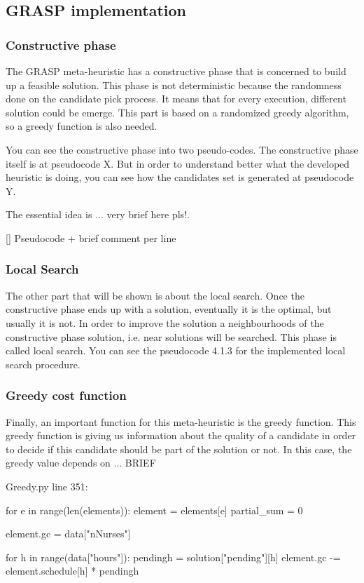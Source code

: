 \subsection{GRASP implementation}

\subsubsection{Constructive phase}

The GRASP meta-heuristic has a constructive phase that is concerned to build up a feasible solution. This phase is not deterministic because the randomness done on the candidate pick process. It means
that for every execution, different solution could be emerge. This part is based on a randomized greedy algorithm, so a greedy function is also needed.

You can see the constructive phase into two pseudo-codes. The constructive phase itself is at pseudocode X. But in order to understand better what the developed heuristic is doing, you can
see how the candidates set is generated at pseudocode Y.

The essential idea is ... very brief here pls!.

[] Pseudocode + brief comment per line



\subsubsection{Local Search}

The other part that will be shown is about the local search. Once the constructive phase ends up with a solution, eventually it is the optimal, but usually it is not. In order to improve the solution a neighbourhoods of the constructive phase solution, i.e. near solutions will be searched. This phase is called local search. You can see the pseudocode 4.1.3 for the implemented local search procedure.

\subsubsection{Greedy cost function}

Finally, an important function for this meta-heuristic is the greedy function. This greedy function is giving us information about the quality of a candidate in order to decide if this candidate should
be part of the solution or not. In this case, the greedy value depends on ... BRIEF

Greedy.py line 351:

for e in range(len(elements)):
        element = elements[e]
        partial\_sum = 0

        element.gc = data["nNurses"]
        
        for h in range(data["hours"]):
            pendingh = solution["pending"][h]
            element.gc -= element.schedule[h] * pendingh


\pagebreak